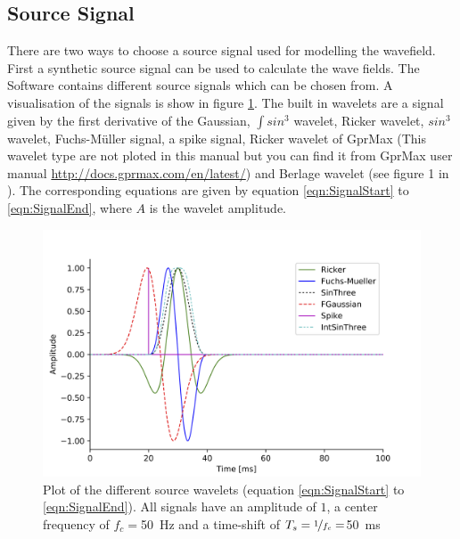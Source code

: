 \documentclass[pdftex,a4paper,parskip,listof=totoc,bibliography=totoc,onehalfspacing,12pt]{scrreprt}
\begin{document}
\subsection{Source Signal}\label{sec:sourcesignal}
There are two ways to choose a source signal used for modelling the wavefield. First a synthetic source signal can be used to calculate the wave fields. The Software contains different source signals which can be chosen from. A visualisation of the signals is show in figure \ref{fig:Signal}. The built in wavelets are a signal given by the first derivative of the Gaussian, $\int sin^3$ wavelet, Ricker wavelet, $sin^3$ wavelet, Fuchs-M\"uller signal, a spike signal, Ricker wavelet of GprMax (This wavelet type are not ploted in this manual but you can find it from GprMax user manual \url{http://docs.gprmax.com/en/latest/}) and Berlage wavelet (see figure 1 in \cite{aldridge1990berlage}). The corresponding equations are given by equation \ref{eqn:SignalStart} to \ref{eqn:SignalEnd}, where $A$ is the wavelet amplitude.
\begin{figure}[h!]
\centering
	\includegraphics[width=.7\textwidth]{images/Signal_Plot.png}
	\caption[Plot of the different source wavelets.]{Plot of the different source wavelets (equation \ref{eqn:SignalStart} to \ref{eqn:SignalEnd}). All signals have an amplitude of $1$, a center frequency of $f_c = $\SI{50}{Hz} and a time-shift of $T_s=\nicefrac{1}{f_c}=$\SI{50}{ms}}\label{fig:Signal}
\end{figure}
\end{document}
